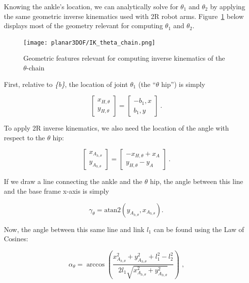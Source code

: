 \documentclass{report}
\begin{document}
Knowing the ankle's location, we can analytically solve for $\theta_{1}$ and $\theta_{2}$ by applying the same geometric inverse kinematics used with 2R robot arms. Figure~\ref{fig:IK_theta_chain} below displays most of the geometry relevant for computing $\theta_1$ and $\theta_2$.

\begin{figure}[H]
	\centering
	\texttt{[image: planar3DOF/IK\_theta\_chain.png]}
	\caption{Geometric features relevant for computing inverse kinematics of the $\theta$-chain}
	\label{fig:IK_theta_chain}
\end{figure}

First, relative to \textit{\{b\}}, the location of joint $\theta_{1}$ (the ``$\theta$ hip'') is simply

\begin{equation*}
\begin{bmatrix}
x_{H,\theta}\\
y_{H,\theta}
\end{bmatrix} = \begin{bmatrix}
-b_1,x\\
b_1,y
\end{bmatrix}\ \text{.}
\end{equation*}

To apply 2R inverse kinematics, we also need the location of the angle with respect to the $\theta$ hip:

\begin{equation*}
\begin{bmatrix}
x_{A_{h,\theta}}\\
y_{A_{h,\theta}}
\end{bmatrix} = \begin{bmatrix}
-x_{H,\theta} + x_A\\
y_{H,\theta} - y_A
\end{bmatrix}\ \text{.}
\end{equation*}

If we draw a line connecting the ankle and the $\theta$ hip, the angle between this line and the base frame x-axis is simply

\begin{equation*}
\gamma_\theta = \text{atan2}(y_{A_{h,\theta}}, x_{A_{h,\theta}}) \text{.}
\end{equation*}

Now, the angle between this same line and link $l_1$ can be found using the Law of Cosines:

\begin{equation*}
\alpha_\theta = \arccos{\left( \frac{x_{A_{h,\theta}}^2 + y_{A_{h,\theta}} ^2 + l_1^2 - l_2^2}{2 l_1 \sqrt{x_{A_{h,\theta}}^2 + y_{A_{h,\theta}} ^2}}\right) } \text{\ ,}
\end{equation*}
\end{document}
